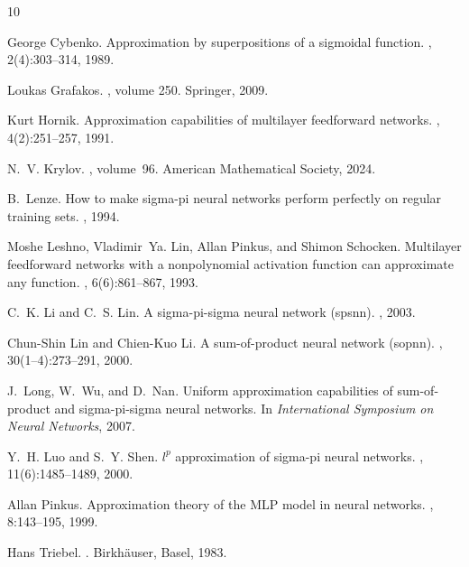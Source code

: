 \documentclass[11pt,reqno]{amsart}
\numberwithin{equation}{section}
\theoremstyle{remark}
\theoremstyle{definition}
\begin{document}
\begin{thebibliography}{10}

George Cybenko.
\newblock Approximation by superpositions of a sigmoidal function.
, 2(4):303--314,
  1989.

Loukas Grafakos.
, volume 250.
\newblock Springer, 2009.

Kurt Hornik.
\newblock Approximation capabilities of multilayer feedforward networks.
, 4(2):251--257, 1991.

N.~V. Krylov.
,
  volume~96.
\newblock American Mathematical Society, 2024.

B.~Lenze.
\newblock How to make sigma-pi neural networks perform perfectly on regular
  training sets.
, 1994.

Moshe Leshno, Vladimir~Ya. Lin, Allan Pinkus, and Shimon Schocken.
\newblock Multilayer feedforward networks with a nonpolynomial activation
  function can approximate any function.
, 6(6):861--867, 1993.

C.~K. Li and C.~S. Lin.
\newblock A sigma-pi-sigma neural network (spsnn).
, 2003.

Chun-Shin Lin and Chien-Kuo Li.
\newblock A sum-of-product neural network (sopnn).
, 30(1--4):273--291, 2000.

J.~Long, W.~Wu, and D.~Nan.
\newblock Uniform approximation capabilities of sum-of-product and
  sigma-pi-sigma neural networks.
\newblock In {\em International Symposium on Neural Networks}, 2007.

Y.~H. Luo and S.~Y. Shen.
\newblock $l^p$ approximation of sigma-pi neural networks.
, 11(6):1485--1489, 2000.

Allan Pinkus.
\newblock Approximation theory of the {MLP} model in neural networks.
, 8:143--195, 1999.

Hans Triebel.
.
\newblock Birkh{\"a}user, Basel, 1983.

\end{thebibliography}
\end{document}
